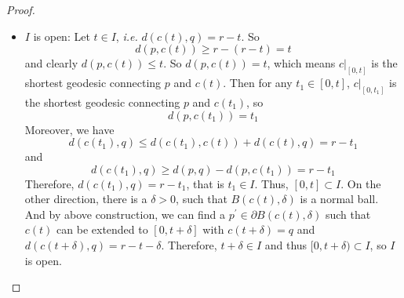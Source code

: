 \begin{enumerate}[label=\Roman*.]
\begin{enumerate}[label=(\roman*)]
\begin{proof}
\begin{itemize}
				\item $I$ is open: Let $t \in I$, \emph{i.e.} $d(c(t),q) = r - t$. So
				\begin{equation*}
					d(p,c(t)) \geq r - (r-t) = t
				\end{equation*}
				and clearly $d(p,c(t)) \leq t$. So $d(p,c(t)) = t$, which means $c|_{[0,t]}$ is the shortest geodesic connecting $p$ and $c(t)$. Then for any $t_1 \in [0,t]$, $c|_{[0,t_1]}$ is the shortest geodesic connecting $p$ and $c(t_1)$, so
				\begin{equation*}
					d(p,c(t_1)) = t_1
				\end{equation*}
				Moreover, we have
				\begin{equation*}
					d(c(t_1),q) \leq d(c(t_1),c(t))+d(c(t),q) = r-t_1
				\end{equation*}
				and 
				\begin{equation*}
					d(c(t_1),q) \geq d(p,q) - d(p,c(t_1)) = r-t_1
				\end{equation*}
				Therefore, $d(c(t_1),q) = r-t_1$, that is $t_1 \in I$. Thus, $[0,t] \subset I$. On the other direction, there is a $\delta > 0$, such that $B(c(t),\delta)$ is a normal ball. And by above construction, we can find a $p^\prime \in \partial B(c(t),\delta)$ such that $c(t)$ can be extended to $[0, t+\delta]$ with $c(t+\delta) = q$ and $d(c(t+\delta),q) = r - t - \delta$. Therefore, $t+\delta \in I$ and thus $[0,t+\delta) \subset I$, so $I$ is open. \qedhere
			\end{itemize}
		\end{proof}
	\end{enumerate}
\end{enumerate}


